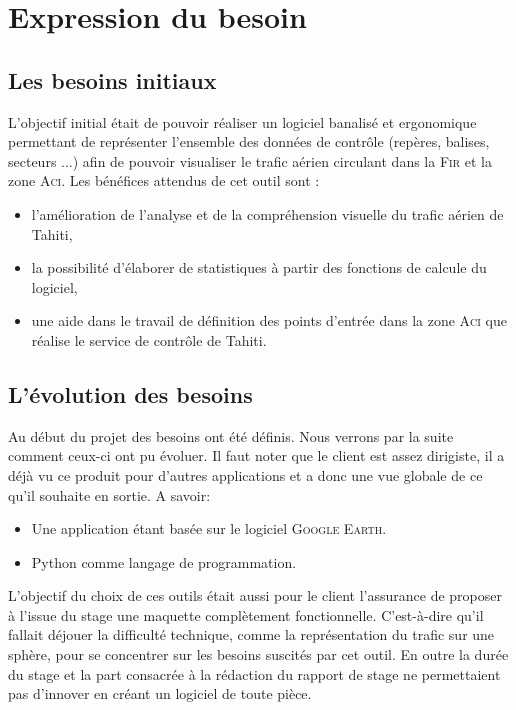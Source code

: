 
\section{Expression du besoin\label{besoins}} 
    \subsection{Les besoins initiaux}
L’objectif initial était de pouvoir réaliser un logiciel banalisé et ergonomique permettant de représenter l’ensemble des données de contrôle (repères, balises, secteurs ...) afin de pouvoir visualiser le trafic aérien circulant dans la \textsc{Fir} et la zone \textsc{Aci}.
Les bénéfices attendus de cet outil sont :
\begin{itemize}
\item l’amélioration de l’analyse et de la compréhension visuelle du trafic aérien de Tahiti,
\item la possibilité d’élaborer de statistiques à partir des fonctions de calcule du logiciel,
\item une aide dans le travail de définition des points d’entrée dans la zone \textsc{Aci} que réalise le service de contrôle de Tahiti.
\end{itemize}\medskip

    \subsection{L’évolution des besoins}
Au début du projet des besoins ont été définis. Nous verrons par la suite comment ceux-ci ont pu évoluer. Il faut noter que le client est assez dirigiste, il a déjà vu ce produit pour d'autres applications et a donc une vue globale de ce qu'il souhaite en sortie. A savoir:
\begin{itemize}
    \item Une application étant basée sur le logiciel \textsc{Google Earth}.
    \item Python comme langage de programmation.
\end{itemize}\medskip

L’objectif du choix de ces outils était aussi pour le client l’assurance de proposer à l’issue du stage une maquette complètement fonctionnelle. C'est-à-dire qu’il fallait déjouer la difficulté technique, comme la représentation du trafic sur une sphère, pour se concentrer sur les besoins suscités par cet outil. En outre la durée du stage et la part consacrée à la rédaction du rapport de stage ne permettaient pas d’innover en créant un logiciel de toute pièce.

